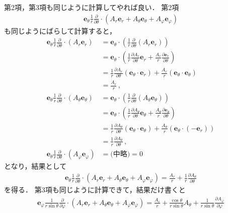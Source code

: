 第2項，第3項も同じように計算してやれば良い．
第2項
\begin{align*}
\bm{e}_{\theta} \frac{1}{r} \frac{ \partial } {\partial \theta} \cdot
 ( A_r \bm{e}_r + A_\theta \bm{e}_\theta + A_\varphi \bm{e}_\varphi )
 \end{align*}
 も同じようにばらして計算すると，
\begin{align*}
\bm{e}_{\theta} \frac{1}{r} \frac{ \partial } {\partial \theta} \cdot
( A_r \bm{e}_r ) 
& = \bm{e}_{\theta} \cdot 
\left( \frac{1}{r} \frac{ \partial } {\partial \theta} ( A_r \bm{e}_r )  \right) \\
& =  \bm{e}_{\theta} \cdot 
\left( \frac{1}{r} \frac{ \partial A_r} {\partial \theta} \bm{e}_r
+ \frac{A_r}{r} \frac{ \partial \bm{e}_r} {\partial \theta} \right) \\
& = \frac{1}{r} \frac{ \partial A_r} {\partial \theta} ( \bm{e}_\theta \cdot \bm{e}_r )
+ \frac{A_r}{r} ( \bm{e}_\theta \cdot \bm{e}_\theta ) \\
& = \frac{A_r}{r} \, , \\
\bm{e}_{\theta} \frac{1}{r} \frac{ \partial } {\partial \theta} \cdot
( A_\theta \bm{e}_\theta ) 
& = \bm{e}_{\theta} \cdot 
\left( \frac{1}{r} \frac{ \partial } {\partial \theta} ( A_\theta \bm{e}_\theta )  \right) \\
& =  \bm{e}_{\theta} \cdot 
\left( \frac{1}{r} \frac{ \partial A_\theta} {\partial \theta} \bm{e}_\theta
+ \frac{A_\theta}{r} \frac{ \partial \bm{e}_\theta} {\partial \theta} \right) \\
& = \frac{1}{r} \frac{ \partial A_\theta} {\partial \theta} (\bm{e}_\theta \cdot \bm{e}_\theta)
+ \frac{A_\theta}{r} ( \bm{e}_\theta \cdot ( - \bm{e}_r )) \\
& = \frac{1}{r} \frac{ \partial A_\theta} {\partial \theta}  \, , \\
\bm{e}_{\theta} \frac{1}{r} \frac{ \partial } {\partial \theta} \cdot
( A_\varphi \bm{e}_\varphi ) & = \text{(中略)} = 0 
\end{align*}
となり，結果として
\begin{align*}
\bm{e}_{\theta} \frac{1}{r} \frac{ \partial } {\partial \theta} \cdot
 ( A_r \bm{e}_r + A_\theta \bm{e}_\theta + A_\varphi \bm{e}_\varphi )
 = \frac{A_r}{r} + \frac{1}{r} \frac{ \partial A_\theta} {\partial \theta}
\end{align*}
を得る．
第3項も同じように計算できて，結果だけ書くと
\begin{align*}
 \bm{e}_{\varphi} \frac{1}{r \sin \theta } \frac{ \partial } {\partial \varphi}
 \cdot ( A_r \bm{e}_r + A_\theta \bm{e}_\theta + A_\varphi \bm{e}_\varphi )
 = \frac{ A_r}{r} + \frac{\cos \theta}{r \sin \theta} A_\theta 
 + \frac{1}{r \sin \theta} \frac{ \partial A_\varphi}{\partial \varphi}
 \end{align*}
